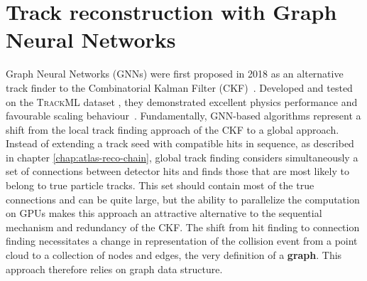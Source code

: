 \chapter{Track reconstruction with Graph Neural Networks}
\label{chap:graph-construction}


Graph Neural Networks (GNNs) were first proposed in 2018 as an alternative track finder to the Combinatorial Kalman Filter (CKF)~\cite{farrell2018noveldeeplearningmethods}.
Developed and tested on the \textsc{TrackML} dataset \cite{trackml-particle-identification}, they demonstrated excellent physics performance and favourable scaling behaviour~\cite{exatrkx, choma2020trackseedinglabellingembeddedspace}.
Fundamentally, GNN-based algorithms represent a shift from the local track finding approach of the CKF to a global approach.
Instead of extending a track seed with compatible hits in sequence, as described in chapter \ref{chap:atlas-reco-chain}, 
global track finding considers simultaneously a set of connections between detector hits and finds those that are most likely to belong to true particle tracks.
This set should contain most of the true connections and can be quite large, but the ability to parallelize the computation on GPUs makes this approach an attractive 
alternative to the sequential mechanism and redundancy of the CKF.
The shift from hit finding to connection finding necessitates a change in representation of the collision event from a point cloud to a collection of nodes and edges, the very definition of a \textbf{graph}. 
This approach therefore relies on graph data structure.

